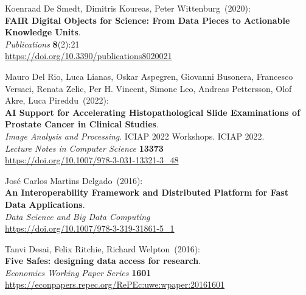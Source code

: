 \begin{thebibliography}{9}
Koenraad De Smedt, Dimitris Koureas, Peter Wittenburg~(2020): \\
\textbf{FAIR Digital Objects for Science: From Data Pieces to Actionable Knowledge Units}.\\
\emph{Publications} \textbf{8}(2):21\\
\url{https://doi.org/10.3390/publications8020021}


Mauro Del Rio, Luca Lianas, Oskar Aspegren, Giovanni Busonera, Francesco Versaci, Renata Zelic, Per H. Vincent, Simone Leo, Andreas Pettersson, Olof Akre, Luca Pireddu~(2022): \\
\textbf{AI Support for Accelerating Histopathological Slide Examinations of Prostate Cancer in Clinical Studies}.\\
\emph{Image Analysis and Processing}. ICIAP 2022 Workshops. ICIAP 2022. \\
\emph{Lecture Notes in Computer Science} \textbf{13373}\\
\url{https://doi.org/10.1007/978-3-031-13321-3_48}

José Carlos Martins Delgado~(2016): \\
\textbf{An Interoperability Framework and Distributed Platform for Fast Data Applications}.\\
\emph{Data Science and Big Data Computing} \\
\url{https://doi.org/10.1007/978-3-319-31861-5_1}

Tanvi Desai, Felix Ritchie, Richard Welpton~(2016): \\
\textbf{Five Safes: designing data access for research}.\\
\emph{Economics Working Paper Series} \textbf{1601}\\
\url{https://econpapers.repec.org/RePEc:uwe:wpaper:20161601}


\end{thebibliography}
